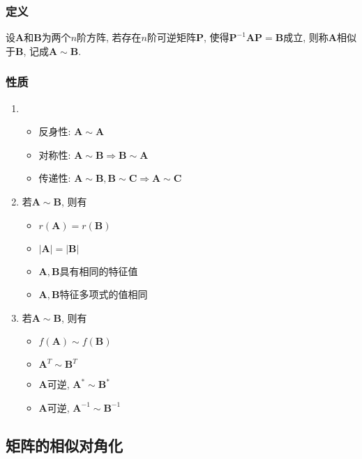 \subsubsection{定义}
设$ \bm{A} $和$ \bm{B} $为两个$ n $阶方阵, 若存在$ n $阶可逆矩阵$ \bm{P} $, 使得$ \bm{P}^{-1}\bm{A}\bm{P}=\bm{B} $成立, 则称$ \bm{A} $相似于$ \bm{B} $, 记成$ \bm{A}\sim \bm{B} $.
\subsubsection{性质}
\begin{enumerate}
\item \begin{itemize}
      \item 反身性: $ \bm{A}\sim \bm{A} $
      \item 对称性: $ \bm{A}\sim \bm{B}\Rightarrow \bm{B}\sim \bm{A} $
      \item 传递性: $ \bm{A}\sim \bm{B}, \bm{B}\sim \bm{C}\Rightarrow \bm{A}\sim \bm{C} $
\end{itemize}
\item 若$ \bm{A}\sim \bm{B} $, 则有\begin{itemize}
                                \item $ r(\bm{A})=r(\bm{B}) $
                                \item $ \left|\bm{A}\right|=\left|\bm{B}\right| $
                                \item $ \bm{A}, \bm{B} $具有相同的特征值
                                \item $ \bm{A}, \bm{B} $特征多项式的值相同
\end{itemize}
\item 若$ \bm{A}\sim \bm{B} $, 则有\begin{itemize}
                                \item $ f(\bm{A})\sim f(\bm{B}) $
                                \item $ \bm{A}^{T}\sim \bm{B}^{T} $
                                \item $ \bm{A} $可逆, $ \bm{A}^{*}\sim \bm{B}^{*} $
                                \item $ \bm{A} $可逆, $ \bm{A}^{-1}\sim \bm{B}^{-1} $
\end{itemize}
\end{enumerate}
\subsection{矩阵的相似对角化}
